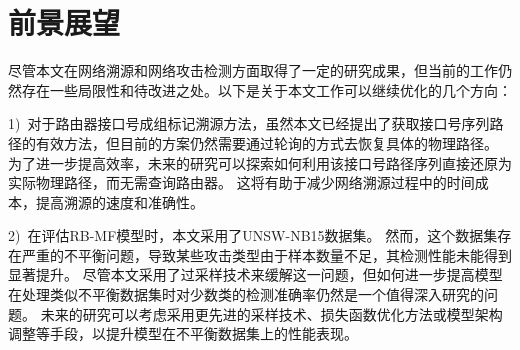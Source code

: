\section{前景展望}
尽管本文在网络溯源和网络攻击检测方面取得了一定的研究成果，但当前的工作仍然存在一些局限性和待改进之处。以下是关于本文工作可以继续优化的几个方向：\par

1)~对于路由器接口号成组标记溯源方法，虽然本文已经提出了获取接口号序列路径的有效方法，但目前的方案仍然需要通过轮询的方式去恢复具体的物理路径。
为了进一步提高效率，未来的研究可以探索如何利用该接口号路径序列直接还原为实际物理路径，而无需查询路由器。
这将有助于减少网络溯源过程中的时间成本，提高溯源的速度和准确性。\par

2)~在评估RB-MF模型时，本文采用了UNSW-NB15数据集。
然而，这个数据集存在严重的不平衡问题，导致某些攻击类型由于样本数量不足，其检测性能未能得到显著提升。
尽管本文采用了过采样技术来缓解这一问题，但如何进一步提高模型在处理类似不平衡数据集时对少数类的检测准确率仍然是一个值得深入研究的问题。
未来的研究可以考虑采用更先进的采样技术、损失函数优化方法或模型架构调整等手段，以提升模型在不平衡数据集上的性能表现。\par